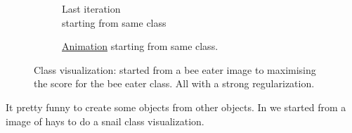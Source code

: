 \begin{figure}[H]
\begin{subfigure}{.33\textwidth}
        \caption{Last iteration\\starting from same class}
        \label{fig:class_viz_start_image:png}
    \end{subfigure}%
    \begin{subfigure}{.33\textwidth}
        \centering
        \caption{\href{figs/2b/SqueezeNet\_bird\_animated\_same\_init\_img\_reg++.gif}{Animation} starting from same class.} %
        \label{fig:class_viz_start_image:vid}
    \end{subfigure}

    \caption{Class visualization: started from a bee eater image to maximising the score for the bee eater class. All with a strong regularization.}
    \label{fig:class_viz_start_image}
\end{figure}

It pretty funny to create some objects from other objects. In  we started from a image of hays to do a snail class visualization.

